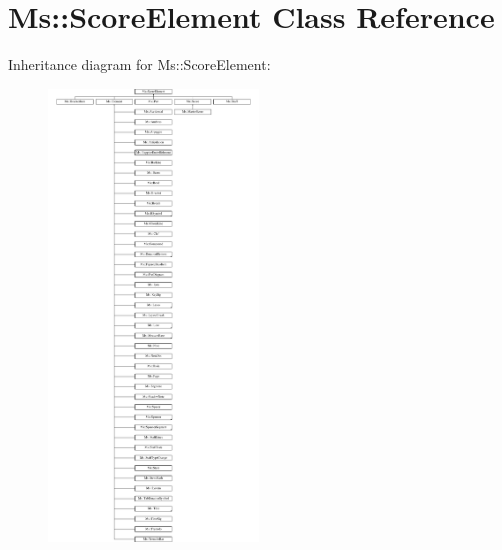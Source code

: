 \hypertarget{class_ms_1_1_score_element}{}\section{Ms\+:\+:Score\+Element Class Reference}
\label{class_ms_1_1_score_element}
Inheritance diagram for Ms\+:\+:Score\+Element\+:\begin{figure}[H]
\begin{center}
\leavevmode
\includegraphics[height=12.000000cm]{class_ms_1_1_score_element}
\end{center}
\end{figure}
